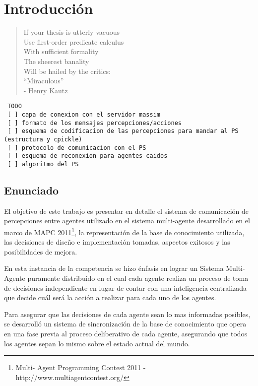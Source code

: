 \chapter{Introducción}
\label{chap:introduccion}

\begin{quote}
\scriptsize{
If your thesis is utterly vacuous   \\
Use first-order predicate calculus  \\
    With sufficient formality       \\
    The sheerest banality           \\
Will be hailed by the critics:      \\
    ``Miraculous''                  \\

- Henry Kautz
}
\end{quote}

 \begin{verbatim}
 TODO
 [ ] capa de conexion con el servidor massim
 [ ] formato de los mensajes percepciones/acciones
 [ ] esquema de codificacion de las percepciones para mandar al PS (estructura y cpickle)
 [ ] protocolo de comunicacion con el PS
 [ ] esquema de reconexion para agentes caidos
 [ ] algoritmo del PS
 \end{verbatim}

\section{Enunciado}
\label{sec:enunciado}

 El objetivo de este trabajo es presentar en detalle el sistema de
 comunicación de percepciones entre agentes utilizado en el sistema
 multi-agente desarrollado en el marco de MAPC 2011\footnote{Multi-
 Agent Programming Contest 2011 - http://www.multiagentcontest.org/},
 la representación de la base de conocimiento utilizada, las decisiones
 de diseño e implementación tomadas, aspectos exitosos y las
 posibilidades de mejora.
 
 En esta instancia de la competencia se hizo énfasis en lograr un
 Sistema Multi-Agente puramente distribuido en el cual cada agente
 realiza un proceso de toma de decisiones independiente en lugar de
 contar con una inteligencia centralizada que decide cuál será la
 acción a realizar para cada uno de los agentes. 
 
 Para asegurar que las decisiones de cada agente sean lo mas informadas
 posibles, se desarrolló un sistema de sincronización de la base de
 conocimiento que opera en una fase previa al proceso deliberativo de
 cada agente, asegurando que todos los agentes sepan lo mismo sobre el
 estado actual del mundo.
 
